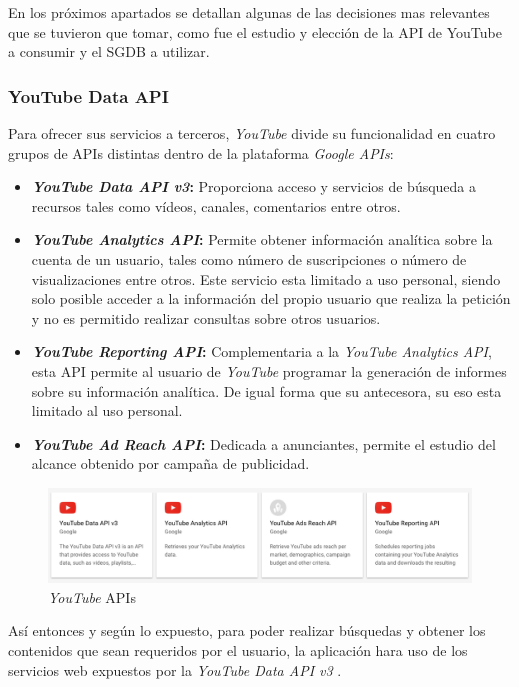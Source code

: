 \documentclass[11pt,a4paper]{article}
\begin{document}
En los próximos apartados se detallan algunas de las decisiones mas relevantes que se tuvieron que tomar, como fue el estudio y elección de la API de YouTube a consumir y el SGDB a utilizar. 
\medskip

\subsubsection{YouTube Data API}\label{youTubeDataAPI} 
Para ofrecer sus servicios a terceros, \textit{YouTube} divide su funcionalidad en cuatro grupos de APIs distintas dentro de la plataforma \textit{Google APIs}:

\begin{itemize}
\item \textbf{\textit{YouTube Data API v3}:} Proporciona acceso y servicios de búsqueda a recursos tales como vídeos, canales, comentarios entre otros.
\item \textbf{\textit{YouTube Analytics API}:} Permite obtener información analítica sobre la cuenta de un usuario, tales como número de suscripciones o número de visualizaciones entre otros. Este servicio esta limitado a uso personal, siendo solo posible acceder a la información del propio usuario que realiza la petición y no es permitido realizar consultas sobre otros usuarios.
\item \textbf{\textit{YouTube Reporting API}:} Complementaria a la \textit{YouTube Analytics API}, esta API permite al usuario de \textit{YouTube} programar la generación de informes sobre su información analítica. De igual forma que su antecesora, su eso esta limitado al uso personal.
\item \textbf{\textit{YouTube Ad Reach API}:} Dedicada a anunciantes, permite el estudio del alcance obtenido por campaña de publicidad.
\end{itemize}

\begin{figure}[H]
\centering
\includegraphics[scale=0.40]{desarrollo/youTubeAPI.png}
\caption{\textit{YouTube} APIs}
\end{figure}

Así entonces y según lo expuesto, para poder realizar búsquedas y obtener los contenidos que sean requeridos por el usuario, la aplicación hara uso de los servicios web expuestos por la \textit{YouTube Data API v3} \cite{29}.
\\
\end{document}
